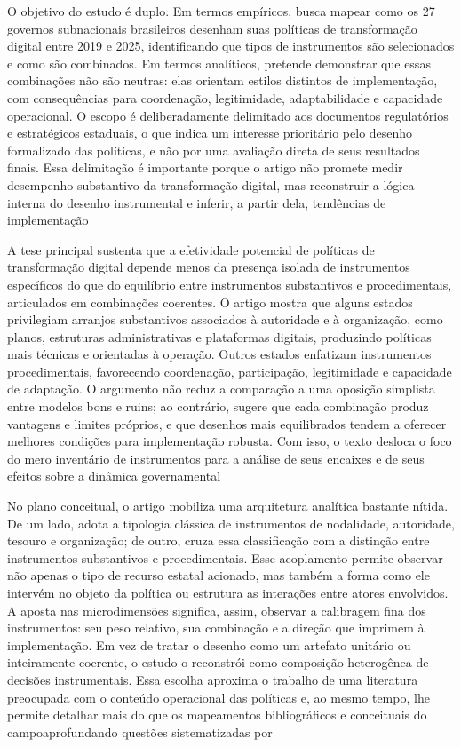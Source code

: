 \documentclass[12pt,a4paper]{article}
\begin{document}
O objetivo do estudo é duplo. Em termos empíricos, busca mapear como os 27 governos subnacionais brasileiros desenham suas políticas de transformação digital entre 2019 e 2025, identificando que tipos de instrumentos são selecionados e como são combinados. Em termos analíticos, pretende demonstrar que essas combinações não são neutras: elas orientam estilos distintos de implementação, com consequências para coordenação, legitimidade, adaptabilidade e capacidade operacional. O escopo é deliberadamente delimitado aos documentos regulatórios e estratégicos estaduais, o que indica um interesse prioritário pelo desenho formalizado das políticas, e não por uma avaliação direta de seus resultados finais. Essa delimitação é importante porque o artigo não promete medir desempenho substantivo da transformação digital, mas reconstruir a lógica interna do desenho instrumental e inferir, a partir dela, tendências de implementação\parencite{lui2026_micro_dimensions}

A tese principal sustenta que a efetividade potencial de políticas de transformação digital depende menos da presença isolada de instrumentos específicos do que do equilíbrio entre instrumentos substantivos e procedimentais, articulados em combinações coerentes. O artigo mostra que alguns estados privilegiam arranjos substantivos associados à autoridade e à organização, como planos, estruturas administrativas e plataformas digitais, produzindo políticas mais técnicas e orientadas à operação. Outros estados enfatizam instrumentos procedimentais, favorecendo coordenação, participação, legitimidade e capacidade de adaptação. O argumento não reduz a comparação a uma oposição simplista entre modelos bons e ruins; ao contrário, sugere que cada combinação produz vantagens e limites próprios, e que desenhos mais equilibrados tendem a oferecer melhores condições para implementação robusta. Com isso, o texto desloca o foco do mero inventário de instrumentos para a análise de seus encaixes e de seus efeitos sobre a dinâmica governamental\parencite{lui2026_micro_dimensions}

No plano conceitual, o artigo mobiliza uma arquitetura analítica bastante nítida. De um lado, adota a tipologia clássica de instrumentos de nodalidade, autoridade, tesouro e organização; de outro, cruza essa classificação com a distinção entre instrumentos substantivos e procedimentais. Esse acoplamento permite observar não apenas o tipo de recurso estatal acionado, mas também a forma como ele intervém no objeto da política ou estrutura as interações entre atores envolvidos. A aposta nas microdimensões significa, assim, observar a calibragem fina dos instrumentos: seu peso relativo, sua combinação e a direção que imprimem à implementação. Em vez de tratar o desenho como um artefato unitário ou inteiramente coerente, o estudo o reconstrói como composição heterogênea de decisões instrumentais. Essa escolha aproxima o trabalho de uma literatura preocupada com o conteúdo operacional das políticas e, ao mesmo tempo, lhe permite detalhar mais do que os mapeamentos bibliográficos e conceituais do campo\parencite{lui2026_micro_dimensions}aprofundando questões sistematizadas por\parencite{lima2021_conectando_problemas}
\end{document}
